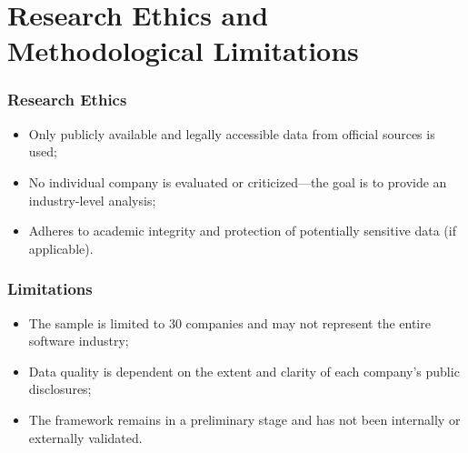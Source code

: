 \section{Research Ethics and Methodological Limitations}
\subsubsection{Research Ethics}
\begin{itemize}
    \item Only publicly available and legally accessible data from official sources is used;
    \item No individual company is evaluated or criticized---the goal is to provide an industry-level analysis;
    \item Adheres to academic integrity and protection of potentially sensitive data (if applicable).
\end{itemize}

\subsubsection{Limitations}
\begin{itemize}
    \item The sample is limited to 30 companies and may not represent the entire software industry;
    \item Data quality is dependent on the extent and clarity of each company’s public disclosures;
    \item The framework remains in a preliminary stage and has not been internally or externally validated.
\end{itemize}